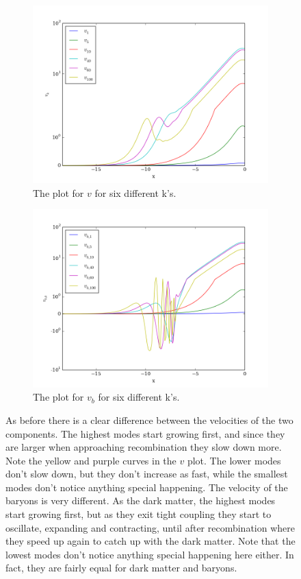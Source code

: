 \documentclass[a4paper]{report}
\begin{document}
\begin{figure}[ht]
\end{figure}

\begin{figure}[ht]
\begin{subfigure}{.5\textwidth}
  \includegraphics[width=\textwidth]{v.png}
 \caption{The plot for $v$ for six different k's.}
 \label{fig:v}
\end{subfigure}
\begin{subfigure}{.5\textwidth}
\includegraphics[width=\textwidth]{vb.png}
 \caption{The plot for $v_b$ for six different k's.}
 \label{fig:vb}
\end{subfigure}
\caption{As before there is a clear difference between the velocities of the two components. The highest modes start growing first, and since they are larger when approaching recombination they slow down more. Note the yellow and purple curves in the $v$ plot. The lower modes don't slow down, but they don't increase as fast, while the smallest modes don't notice anything special happening. The velocity of the baryons is very different. As the dark matter, the highest modes start growing first, but as they exit tight coupling they start to oscillate, expanding and contracting, until after recombination where they speed up again to catch up with the dark matter. Note that the lowest modes don't notice anything special happening here either. In fact, they are fairly equal for dark matter and baryons.}

\end{figure}
\end{document}
